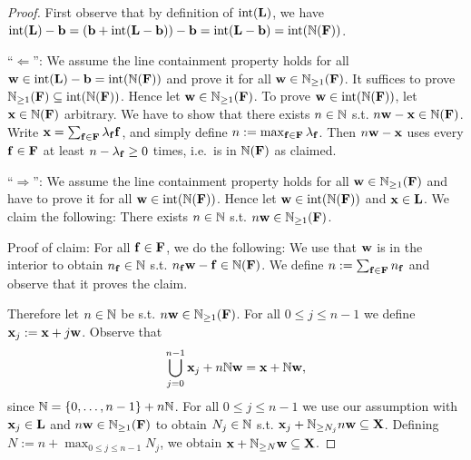 \begin{proof}
First observe that by definition of \(\operatorname{int}(\mathbf{L})\), we have \(\operatorname{int}(\mathbf{L})-\mathbf{b}=(\mathbf{b}+\operatorname{int}(\mathbf{L}-\mathbf{b}))-\mathbf{b}=\operatorname{int}(\mathbf{L}-\mathbf{b})=\operatorname{int}(\mathbb{N}(\mathbf{F}))\).

``\(\Leftarrow\)'': We assume the line containment property holds for all \(\mathbf{w} \in \operatorname{int}(\mathbf{L})- \mathbf{b}=\operatorname{int}(\mathbb{N}(\mathbf{F}))\) and prove it for all \(\mathbf{w} \in \mathbb{N}_{\geq 1}(\mathbf{F})\). It suffices to prove \(\mathbb{N}_{\geq 1}(\mathbf{F}) \subseteq \operatorname{int}(\mathbb{N}(\mathbf{F}))\). Hence let \(\mathbf{w} \in \mathbb{N}_{\geq 1}(\mathbf{F})\). To prove \(\mathbf{w} \in \operatorname{int}(\mathbb{N}(\mathbf{F}))\), let \(\mathbf{x} \in \mathbb{N}(\mathbf{F})\) arbitrary. We have to show that there exists \(n \in \mathbb{N}\) s.t. \(n \mathbf{w} - \mathbf{x} \in \mathbb{N}(\mathbf{F})\). Write \(\mathbf{x}=\sum_{\mathbf{f} \in \mathbf{F}} \lambda_{\mathbf{f}} \mathbf{f}\), and simply define \(n:=\max_{\mathbf{f} \in \mathbf{F}} \lambda_{\mathbf{f}}\). Then \(n \mathbf{w} - \mathbf{x}\) uses every \(\mathbf{f} \in \mathbf{F}\) at least \(n-\lambda_{\mathbf{f}} \geq 0\) times, i.e.\ is in \(\mathbb{N}(\mathbf{F})\) as claimed.

``\(\Rightarrow\)'': We assume the line containment property holds for all \(\mathbf{w} \in \mathbb{N}_{\geq 1}(\mathbf{F})\) and have to prove it for all \(\mathbf{w} \in \operatorname{int}(\mathbb{N}(\mathbf{F}))\). Hence let \(\mathbf{w} \in \operatorname{int}(\mathbb{N}(\mathbf{F}))\) and \(\mathbf{x} \in \mathbf{L}\). We claim the following: There exists \(n \in \mathbb{N}\) s.t. \(n \mathbf{w} \in \mathbb{N}_{\geq 1}(\mathbf{F})\). 

Proof of claim: For all \(\mathbf{f} \in \mathbf{F}\), we do the following: We use that \(\mathbf{w}\) is in the interior to obtain \(n_{\mathbf{f}} \in \mathbb{N}\) s.t. \(n_{\mathbf{f}} \mathbf{w}- \mathbf{f} \in \mathbb{N}(\mathbf{F})\). We define \(n:=\sum_{\mathbf{f} \in \mathbf{F}} n_{\mathbf{f}}\) and observe that it proves the claim.

Therefore let \(n \in \mathbb{N}\) be s.t. \(n \mathbf{w} \in \mathbb{N}_{\geq 1}(\mathbf{F})\). For all \(0 \leq j \leq n-1\) we define \(\mathbf{x}_j:=\mathbf{x}+j \mathbf{w}\). Observe that \[\bigcup_{j=0}^{n-1} \mathbf{x}_j+n \mathbb{N} \mathbf{w}=\mathbf{x}+\mathbb{N} \mathbf{w},\] since \(\mathbb{N}=\{0, \dots, n-1\}+n\mathbb{N}\). For all \(0 \leq j \leq n-1\) we use our assumption with \(\mathbf{x}_j \in \mathbf{L}\) and \(n\mathbf{w} \in \mathbb{N}_{\geq 1}(\mathbf{F})\) to obtain \(N_j \in \mathbb{N}\) s.t. \(\mathbf{x}_j+\mathbb{N}_{\geq N_j} n \mathbf{w} \subseteq \mathbf{X}\). Defining \(N:=n+\max_{0 \leq j \leq n-1} N_j\), we obtain \(\mathbf{x}+\mathbb{N}_{\geq N} \mathbf{w} \subseteq \mathbf{X}\).
\end{proof}

